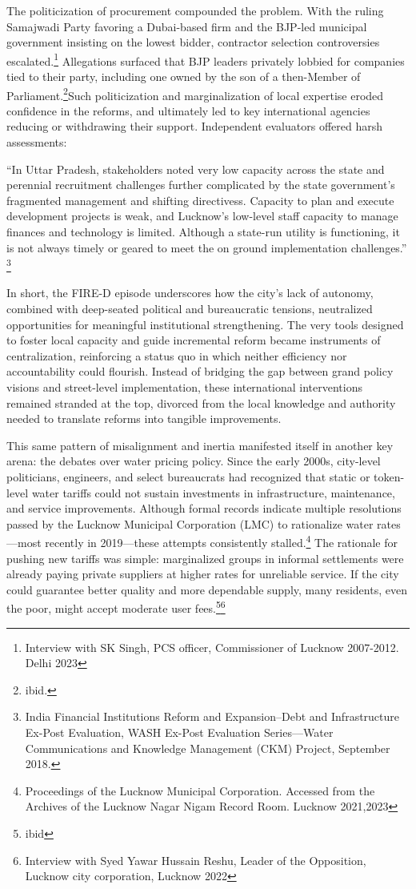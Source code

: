 The politicization of procurement compounded the problem. With the ruling Samajwadi Party favoring a Dubai-based firm and the BJP-led municipal government insisting on the lowest bidder, contractor selection controversies escalated.\footnote{Interview with SK Singh, PCS officer, Commissioner of Lucknow 2007-2012. Delhi 2023} Allegations surfaced that BJP leaders privately lobbied for companies tied to their party, including one owned by the son of a then-Member of Parliament.\footnote{ibid.}Such politicization and marginalization of local expertise eroded confidence in the reforms, and ultimately led to key international agencies reducing or withdrawing their support. Independent evaluators offered harsh assessments:

“In Uttar Pradesh, stakeholders noted very low capacity across the state and perennial recruitment challenges further complicated by the state government’s fragmented management and shifting directivess. Capacity to plan and execute development projects is weak, and Lucknow’s low-level staff capacity to manage finances and technology is limited. Although a state-run utility is functioning, it is not always timely or geared to meet the on ground implementation challenges.” \footnote{India Financial Institutions Reform and Expansion–Debt and Infrastructure Ex-Post Evaluation, WASH Ex-Post Evaluation Series—Water Communications and Knowledge Management (CKM) Project, September 2018.}

In short, the FIRE-D episode underscores how the city’s lack of autonomy, combined with deep-seated political and bureaucratic tensions, neutralized opportunities for meaningful institutional strengthening. The very tools designed to foster local capacity and guide incremental reform became instruments of centralization, reinforcing a status quo in which neither efficiency nor accountability could flourish. Instead of bridging the gap between grand policy visions and street-level implementation, these international interventions remained stranded at the top, divorced from the local knowledge and authority needed to translate reforms into tangible improvements.

This same pattern of misalignment and inertia manifested itself in another key arena: the debates over water pricing policy. Since the early 2000s, city-level politicians, engineers, and select bureaucrats had recognized that static or token-level water tariffs could not sustain investments in infrastructure, maintenance, and service improvements. Although formal records indicate multiple resolutions passed by the Lucknow Municipal Corporation (LMC) to rationalize water rates—most recently in 2019—these attempts consistently stalled.\footnote{Proceedings of the Lucknow Municipal Corporation. Accessed from the Archives of the Lucknow Nagar Nigam Record Room. Lucknow 2021,2023} The rationale for pushing new tariffs was simple: marginalized groups in informal settlements were already paying private suppliers at higher rates for unreliable service. If the city could guarantee better quality and more dependable supply, many residents, even the poor, might accept moderate user fees.\footnote{ibid}\footnote{Interview with Syed Yawar Hussain Reshu, Leader of the Opposition, Lucknow city corporation, Lucknow 2022}

